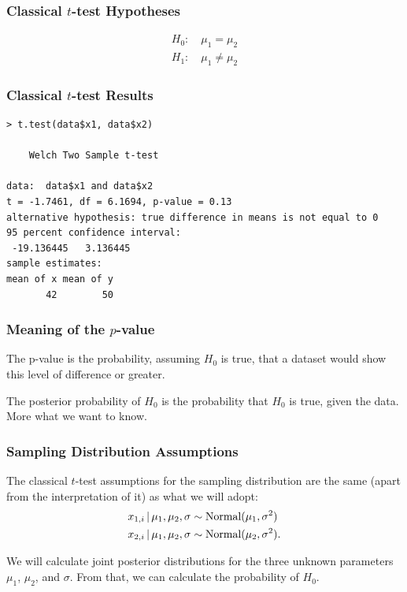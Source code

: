 \documentclass{beamer}
\newcommand{\given}{\,|\,}
\begin{document}
\begin{frame}
\frametitle{Classical $t$-test Hypotheses}

\begin{align}
H_0: \quad \mu_1 = \mu_2 \\
H_1: \quad \mu_1 \neq \mu_2
\end{align}
\end{frame}


\begin{frame}[fragile]
\frametitle{Classical $t$-test Results}
\footnotesize
\begin{verbatim}
> t.test(data$x1, data$x2)

	Welch Two Sample t-test

data:  data$x1 and data$x2
t = -1.7461, df = 6.1694, p-value = 0.13
alternative hypothesis: true difference in means is not equal to 0
95 percent confidence interval:
 -19.136445   3.136445
sample estimates:
mean of x mean of y 
       42        50 
\end{verbatim}

\end{frame}


\begin{frame}[fragile]
\frametitle{Meaning of the $p$-value}
The p-value is the probability, assuming $H_0$ is true, that a dataset would
show this level of difference or greater.\\[0.5em]\pause

The posterior probability of $H_0$ is the probability that $H_0$ is true,
given the data. More what we want to know.
\end{frame}

\begin{frame}
\frametitle{Sampling Distribution Assumptions}
The classical $t$-test assumptions for the sampling distribution are the same
(apart from the interpretation of it) as what we will adopt:
\begin{align}
x_{1, i} \given \mu_1, \mu_2, \sigma &\sim \textnormal{Normal}(\mu_1, \sigma^2) \\
x_{2, i} \given \mu_1, \mu_2, \sigma &\sim \textnormal{Normal}(\mu_2, \sigma^2).
\end{align}
\pause

We will calculate joint posterior distributions for the
three  unknown parameters $\mu_1$, $\mu_2$, and
$\sigma$. From that, we can calculate the probability of $H_0$.


\end{frame}
\end{document}

